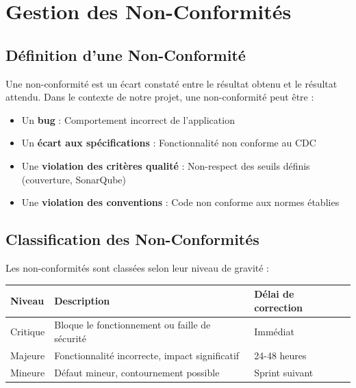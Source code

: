 \documentclass[12pt,a4paper]{report}
\begin{document}
\newpage

\chapter{Gestion des Non-Conformités}

\section{Définition d'une Non-Conformité}

Une non-conformité est un écart constaté entre le résultat obtenu et le résultat attendu. Dans le contexte de notre projet, une non-conformité peut être :

\begin{itemize}
    \item Un \textbf{bug} : Comportement incorrect de l'application
    \item Un \textbf{écart aux spécifications} : Fonctionnalité non conforme au CDC
    \item Une \textbf{violation des critères qualité} : Non-respect des seuils définis (couverture, SonarQube)
    \item Une \textbf{violation des conventions} : Code non conforme aux normes établies
\end{itemize}

\section{Classification des Non-Conformités}

Les non-conformités sont classées selon leur niveau de gravité :

\begin{center}
\begin{tabular}{|l|l|l|}
    \hline
    \textbf{Niveau} & \textbf{Description} & \textbf{Délai de correction} \\
    \hline
    Critique & Bloque le fonctionnement ou faille de sécurité & Immédiat \\
    \hline
    Majeure & Fonctionnalité incorrecte, impact significatif & 24-48 heures \\
    \hline
    Mineure & Défaut mineur, contournement possible & Sprint suivant \\
    \hline
\end{tabular}
\end{center}
\end{document}
